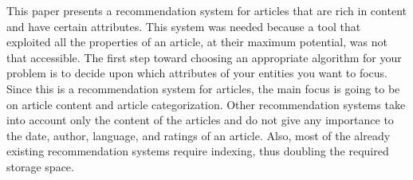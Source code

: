 
This paper presents a recommendation system for articles that are rich in content and have certain attributes. This system was needed because a tool that exploited all the properties of an article, at their maximum potential, was not that accessible. The first step toward choosing an appropriate algorithm for your problem is to decide upon which attributes of your entities you want to focus. Since this is a recommendation system for articles, the main focus is going to be on article content and article categorization. Other recommendation systems take into account only the content of the articles and do not give any importance to the date, author, language, and ratings of an article. Also, most of the already existing recommendation systems require indexing, thus doubling the required storage space.
